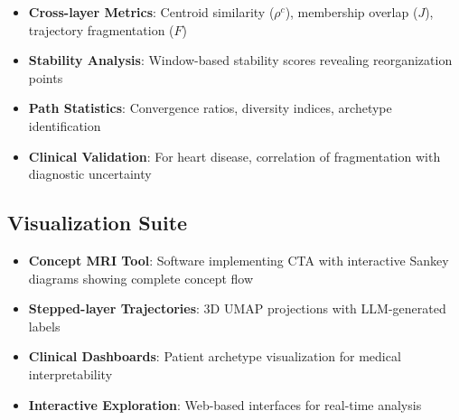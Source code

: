 \begin{itemize}
    \item \textbf{Cross-layer Metrics}: Centroid similarity ($\rho^c$), membership overlap ($J$), trajectory fragmentation ($F$)
    \item \textbf{Stability Analysis}: Window-based stability scores revealing reorganization points
    \item \textbf{Path Statistics}: Convergence ratios, diversity indices, archetype identification
    \item \textbf{Clinical Validation}: For heart disease, correlation of fragmentation with diagnostic uncertainty
\end{itemize}

\subsection{Visualization Suite}

\begin{itemize}
    \item \textbf{Concept MRI Tool}: Software implementing CTA with interactive Sankey diagrams showing complete concept flow
    \item \textbf{Stepped-layer Trajectories}: 3D UMAP projections with LLM-generated labels
    \item \textbf{Clinical Dashboards}: Patient archetype visualization for medical interpretability
    \item \textbf{Interactive Exploration}: Web-based interfaces for real-time analysis
\end{itemize}

